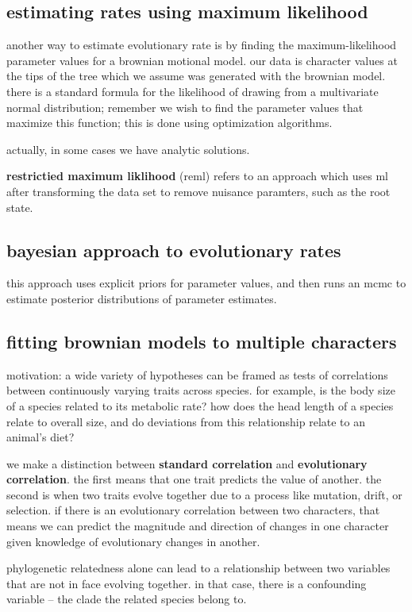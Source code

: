 \documentclass{article}
\begin{document}
\subsection{estimating rates using maximum likelihood}
another way to estimate evolutionary rate is by finding the maximum-likelihood
parameter values for a brownian motional model. our data is character values at
the tips of the tree which we assume was generated with the brownian model.
there is a standard formula for the likelihood of drawing from a multivariate
normal distribution; remember we wish to find the parameter values that maximize
this function; this is done using optimization algorithms.

actually, in some cases we have analytic solutions.

\textbf{restrictied maximum liklihood} (reml) refers to an approach which uses
ml after transforming the data set to remove nuisance paramters, such as the
root state.


\subsection{bayesian approach to evolutionary rates}
this approach uses explicit priors for parameter values, and then runs an mcmc
to estimate posterior distributions of parameter estimates.


\subsection{fitting brownian models to multiple characters}
motivation: a wide variety of hypotheses can be framed as tests of correlations
between continuously varying traits across species. for example, is the body
size of a species related to its metabolic rate? how does the head length of a
species relate to overall size, and do deviations from this relationship relate
to an animal’s diet?

we make a distinction between \textbf{standard correlation} and
\textbf{evolutionary correlation}. the first means that one trait predicts the
value of another. the second is when two traits evolve together due to a process
like mutation, drift, or selection. if there is an evolutionary correlation
between two characters, that means we can predict the magnitude and direction of
changes in one character given knowledge of evolutionary changes in another.

phylogenetic relatedness alone can lead to a relationship between two variables
that are not in face evolving together. in that case, there is a confounding
variable -- the clade the related species belong to.
\end{document}
